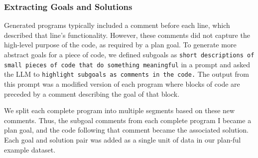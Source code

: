 

\subsubsection*{Extracting Goals and Solutions}Generated programs 
typically included a comment before each line, which described that line's functionality. However, these comments did not capture the high-level purpose of the code, as required by a plan goal. To generate more abstract goals for a piece of code, we defined subgoals as \texttt{short descriptions of small pieces of code that do something meaningful} in a prompt and asked the LLM to \texttt{highlight subgoals as comments in the code.} %
The output from this prompt was a modified version of each program
where blocks of code are preceded by a comment describing the goal of that block. %

We split each complete program into multiple segments based on these new comments. Thus, the subgoal comments from each complete program I
became a plan goal, and the code following that comment became the associated solution. %
Each goal 
and solution pair
was added as a single unit of data in our plan-ful example dataset.

